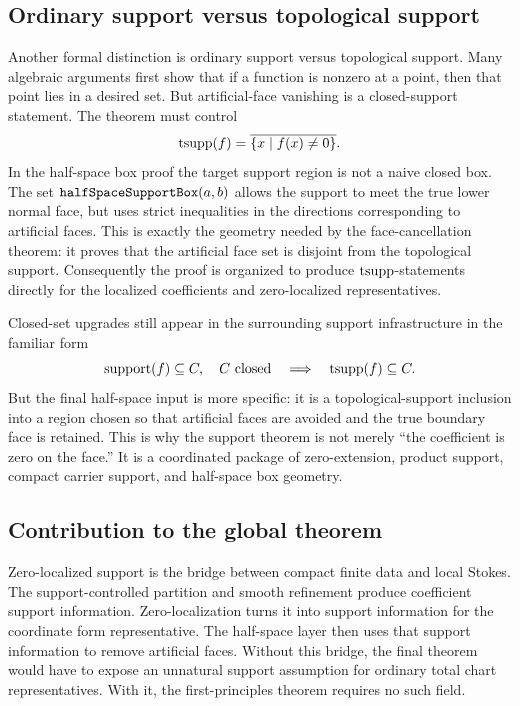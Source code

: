 \subsection{Ordinary support versus topological support}

Another formal distinction is ordinary support versus topological support.
Many algebraic arguments first show that if a function is nonzero at a point,
then that point lies in a desired set.  But artificial-face vanishing is a
closed-support statement.  The theorem must control
\[
  \operatorname{tsupp}(f)=\overline{\{x\mid f(x)\ne0\}}.
\]
In the half-space box proof the target support region is not a naive closed
box.  The set \(\code{halfSpaceSupportBox}(a,b)\) allows the support to meet
the true lower normal face, but uses strict inequalities in the directions
corresponding to artificial faces.  This is exactly the geometry needed by the
face-cancellation theorem: it proves that the artificial face set is disjoint
from the topological support.  Consequently the proof is organized to produce
\(\operatorname{tsupp}\)-statements directly for the localized coefficients and
zero-localized representatives.

Closed-set upgrades still appear in the surrounding support infrastructure in
the familiar form
\[
  \operatorname{support}(f)\subseteq C,\quad C\text{ closed}
  \quad\Longrightarrow\quad
  \operatorname{tsupp}(f)\subseteq C.
\]
But the final half-space input is more specific: it is a topological-support
inclusion into a region chosen so that artificial faces are avoided and the
true boundary face is retained.  This is why the support theorem is not merely
``the coefficient is zero on the face.''  It is a coordinated package of
zero-extension, product support, compact carrier support, and half-space box
geometry.

\subsection{Contribution to the global theorem}

Zero-localized support is the bridge between compact finite data and local
Stokes.  The support-controlled partition and smooth refinement produce
coefficient support information.  Zero-localization turns it into support
information for the coordinate form representative.  The half-space layer then
uses that support information to remove artificial faces.  Without this bridge,
the final theorem would have to expose an unnatural support assumption for
ordinary total chart representatives.  With it, the first-principles theorem
requires no such field.
